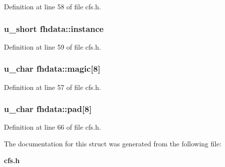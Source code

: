Definition at line 58 of file cfs.h.
\subsubsection{\setlength{\rightskip}{0pt plus 5cm}u\_\-short {\bf fhdata::instance}}\label{structfhdata_o2}




Definition at line 59 of file cfs.h.
\subsubsection{\setlength{\rightskip}{0pt plus 5cm}u\_\-char {\bf fhdata::magic}[8]}\label{structfhdata_o0}




Definition at line 57 of file cfs.h.
\subsubsection{\setlength{\rightskip}{0pt plus 5cm}u\_\-char {\bf fhdata::pad}[8]}\label{structfhdata_o5}




Definition at line 66 of file cfs.h.

The documentation for this struct was generated from the following file:\begin{CompactItemize}
\item 
{\bf cfs.h}\end{CompactItemize}
